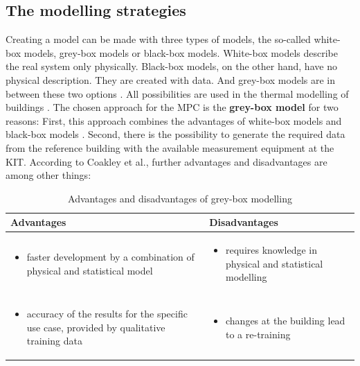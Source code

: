     \subsection{The modelling strategies}
    \label{ModellingStrategies}
    Creating a model can be made with three types of models, the so-called white-box models, grey-box models or black-box models. White-box models describe the real system only physically. Black-box models, on the other hand, have no physical description. They are created with data. And grey-box models are in between these two options \cite{Statusseminar.ForschungfurEnergieoptimiertesBauen.2009}. All possibilities are used in the thermal modelling of buildings \cite{Kramer.2012}.
    \newline
    The chosen approach for the MPC is the \textbf{grey-box model} for two reasons: First, this approach combines the advantages of white-box models and black-box models \cite{EstradaFlores.2006}. Second, there is the possibility to generate the required data from the reference building with the available measurement equipment at the KIT. According to Coakley et al., further advantages and disadvantages are among other things\cite{Coakley.2014}:
    \begin{table}[h!]
    \label{Advantages and disadvantages of grey-box modelling}
        \centering
        \begin{tabular}{p{7.3cm} | p{7.3cm}}
        \hline
          Advantages  &  Disadvantages\\
        \hline
        \begin{itemize}
            \item faster development by a combination of physical and statistical model
        \end{itemize}
      & \begin{itemize}
            \item requires knowledge in physical and statistical modelling 
        \end{itemize}\\
     \begin{itemize}
            \item accuracy of the results for the specific use case, provided by qualitative training data
        \end{itemize} & \begin{itemize}
            \item changes at the building lead to a re-training
        \end{itemize}\\
        \end{tabular}
        \caption {Advantages and disadvantages of grey-box modelling}
    \end{table}
